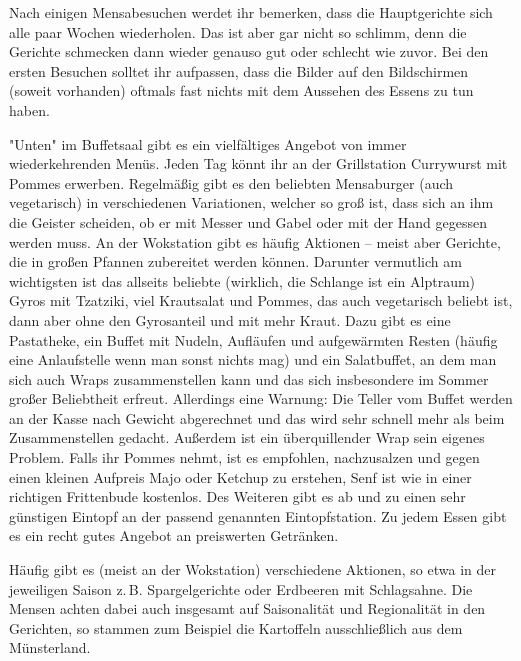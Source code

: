 \begin{multicols}{2}
Nach einigen Mensabesuchen werdet ihr bemerken, dass die Hauptgerichte sich alle paar Wochen wiederholen.
Das ist aber gar nicht so schlimm, denn die Gerichte schmecken dann wieder genauso gut oder schlecht wie zuvor.
Bei den ersten Besuchen solltet ihr aufpassen, dass die Bilder auf den Bildschirmen (soweit vorhanden) oftmals fast nichts mit dem Aussehen des Essens zu tun haben.


"Unten" im Buffetsaal gibt es ein vielfältiges Angebot von immer wiederkehrenden Menüs.
Jeden Tag könnt ihr an der Grillstation Currywurst mit Pommes erwerben.
Regelmäßig gibt es den beliebten Mensaburger (auch vegetarisch) in verschiedenen Variationen, welcher so groß ist, dass sich an ihm die Geister scheiden, ob er mit Messer und Gabel oder mit der Hand gegessen werden muss.
An der Wokstation gibt es häufig Aktionen – meist aber Gerichte, die in großen Pfannen zubereitet werden können. Darunter vermutlich am wichtigsten ist das allseits beliebte (wirklich, die Schlange ist ein Alptraum) Gyros mit Tzatziki, viel Krautsalat und Pommes, das auch vegetarisch beliebt ist, dann aber ohne den Gyrosanteil und mit mehr Kraut.
Dazu gibt es eine Pastatheke, ein Buffet mit Nudeln, Aufläufen und aufgewärmten Resten (häufig eine Anlaufstelle wenn man sonst nichts mag) und ein Salatbuffet, an dem man sich auch Wraps zusammenstellen kann und das sich insbesondere im Sommer großer Beliebtheit erfreut. Allerdings eine Warnung: Die Teller vom Buffet werden an der Kasse nach Gewicht abgerechnet und das wird sehr schnell mehr als beim Zusammenstellen gedacht. Außerdem ist ein überquillender Wrap sein eigenes Problem.
Falls ihr Pommes nehmt, ist es empfohlen, nachzusalzen und gegen einen kleinen Aufpreis Majo oder Ketchup zu erstehen, Senf ist wie in einer richtigen Frittenbude kostenlos.
Des Weiteren gibt es ab und zu einen sehr günstigen Eintopf an der passend genannten Eintopfstation.
Zu jedem Essen gibt es ein recht gutes Angebot an preiswerten Getränken.

Häufig gibt es (meist an der Wokstation) verschiedene Aktionen, so etwa in der jeweiligen Saison z.\,B. Spargelgerichte oder Erdbeeren mit Schlagsahne. Die Mensen achten dabei auch insgesamt auf Saisonalität und Regionalität in den Gerichten, so stammen zum Beispiel die Kartoffeln ausschließlich aus dem Münsterland.


\end{multicols}
